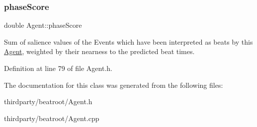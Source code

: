 \subsubsection{\texorpdfstring{phase\+Score}{phaseScore}}
{\footnotesize\ttfamily double Agent\+::phase\+Score}

Sum of salience values of the Events which have been interpreted as beats by this \hyperlink{class_agent}{Agent}, weighted by their nearness to the predicted beat times. 

Definition at line 79 of file Agent.\+h.



The documentation for this class was generated from the following files\+:\begin{DoxyCompactItemize}
\item 
thirdparty/beatroot/Agent.\+h\item 
thirdparty/beatroot/Agent.\+cpp\end{DoxyCompactItemize}

